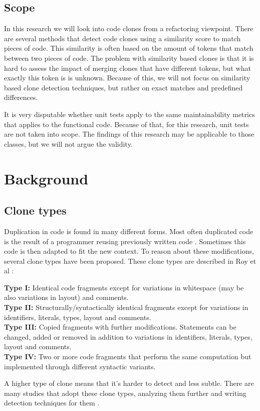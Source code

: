 \documentclass{report}
\theoremstyle{definition}
\theoremstyle{remark}
\begin{document}
\section{Scope}
In this research we will look into code clones from a refactoring viewpoint. There are several methods that detect code clones using a similarity score to match pieces of code. This similarity is often based on the amount of tokens that match between two pieces of code. The problem with similarity based clones is that it is hard to assess the impact of merging clones that have different tokens, but what exactly this token is is unknown. Because of this, we will not focus on similarity based clone detection techniques, but rather on exact matches and predefined differences.

It is very disputable whether unit tests apply to the same maintainability metrics that applies to the functional code. Because of that, for this research, unit tests are not taken into scope. The findings of this research may be applicable to those classes, but we will not argue the validity. %

\chapter{Background}
\section{Clone types}
Duplication in code is found in many different forms. Most often duplicated code is the result of a programmer reusing previously written code \cite{haefliger2008code, baxter1998clone}. Sometimes this code is then adapted to fit the new context. To reason about these modifications, several clone types have been proposed. These clone types are described in Roy et al \cite{roy2007survey}:
\begin{displayquote}
\textbf{Type I:} Identical code fragments except for variations in whitespace (may be also variations in layout) and comments.\\
\textbf{Type II:} Structurally/syntactically identical fragments except for variations in identifiers, literals, types, layout and comments.\\
\textbf{Type III:} Copied fragments with further modifications. Statements can be changed, added or removed in addition to variations in identifiers, literals, types, layout and comments.\\
\textbf{Type IV:} Two or more code fragments that perform the same computation but implemented through different syntactic variants.
\end{displayquote}
A higher type of clone means that it's harder to detect and less subtle. There are many studies that adopt these clone types, analyzing them further and writing detection techniques for them \cite{sajnani2016sourcerercc, kodhai2010detection, van2019novel}.
\end{document}
